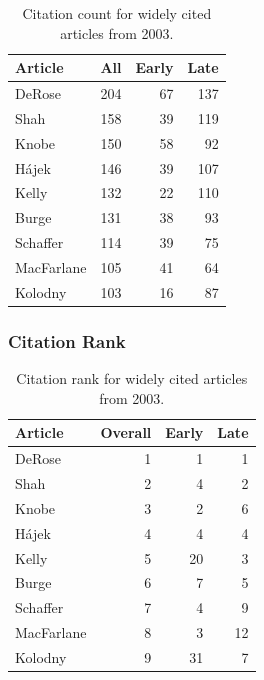 \documentclass[
  10pt,
  letterpaper,
  DIV=11,
  numbers=noendperiod,
  twoside]{scrartcl}
\begin{document}
\begin{longtable}[]{@{}lrrr@{}}

\caption{\label{tbl-citation-count-2003}Citation count for widely cited
articles from 2003.}

\tabularnewline

\toprule\noalign{}
Article & All & Early & Late \\
\midrule\noalign{}
\endhead
\bottomrule\noalign{}
\endlastfoot
DeRose & 204 & 67 & 137 \\
Shah & 158 & 39 & 119 \\
Knobe & 150 & 58 & 92 \\
Hájek & 146 & 39 & 107 \\
Kelly & 132 & 22 & 110 \\
Burge & 131 & 38 & 93 \\
Schaffer & 114 & 39 & 75 \\
MacFarlane & 105 & 41 & 64 \\
Kolodny & 103 & 16 & 87 \\

\end{longtable}

\subsubsection*{Citation Rank}\label{sec-rank-2003}

\begin{longtable}[]{@{}lrrr@{}}

\caption{\label{tbl-citation-rank-2003}Citation rank for widely cited
articles from 2003.}

\tabularnewline

\toprule\noalign{}
Article & Overall & Early & Late \\
\midrule\noalign{}
\endhead
\bottomrule\noalign{}
\endlastfoot
DeRose & 1 & 1 & 1 \\
Shah & 2 & 4 & 2 \\
Knobe & 3 & 2 & 6 \\
Hájek & 4 & 4 & 4 \\
Kelly & 5 & 20 & 3 \\
Burge & 6 & 7 & 5 \\
Schaffer & 7 & 4 & 9 \\
MacFarlane & 8 & 3 & 12 \\
Kolodny & 9 & 31 & 7 \\

\end{longtable}
\end{document}
